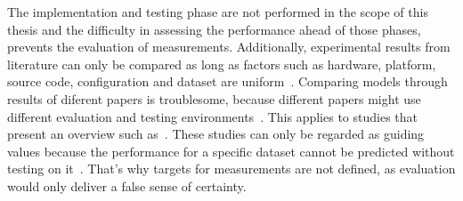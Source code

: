 The implementation and testing phase are not performed in the scope of this thesis and the
difficulty in assessing the performance ahead of those phases, prevents the evaluation
of measurements.
Additionally, experimental results from literature can only be compared as long as factors such as
hardware, platform, source code, configuration and dataset are uniform~\citep{arpteg_software_2018}.
Comparing models through results of diferent papers is troublesome, because different papers
might use different evaluation and testing environments~\citep{baek_what_2019}.
This applies to studies that present an overview such as~\cite{chen_text_2021,long_scene_2021}.
These studies can only be regarded as guiding values because the performance for a specific dataset
cannot be predicted without testing on it~\cite{arpteg_software_2018}.
That's why targets for measurements are not defined, as evaluation would only deliver a false
sense of certainty.

